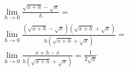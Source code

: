 \begin{ex}
\begin{align}
&\lim_{h\rightarrow 0} \frac{\sqrt{x+h}-\sqrt{x}}{h}=\nonumber\\
&\lim_{h\rightarrow 0}\frac{(\sqrt{x+h}-\sqrt{x})(\sqrt{x+h}+\sqrt{x})}{h(\sqrt{x+h}+\sqrt{x})}=\nonumber\\
&\lim_{h\rightarrow 0} \frac{x+h-x}{h(\sqrt{x+h}+\sqrt{x})}= \frac{1}{2\sqrt{x}}\nonumber
\end{align}
\end{ex}